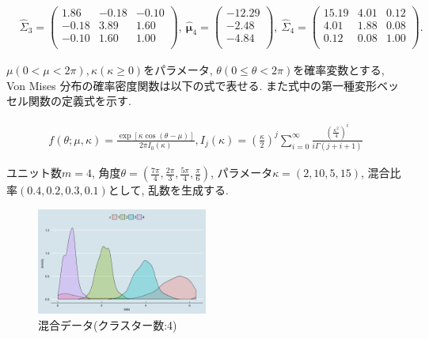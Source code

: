 \documentclass[a4j,12pt]{jarticle}
\begin{document}
\begin{equation}
\begin{split}
&\hat \Sigma_3 = \begin{pmatrix}  1.86  & -0.18 &  -0.10 \\-0.18 & 3.89 & 1.60 \\  -0.10 & 1.60 & 1.00 \\ \end{pmatrix},\ 
\hat{\bm \mu}_4 = \begin{pmatrix} -12.29   \\ -2.48 \\ -4.84 \\ \end{pmatrix},\ 
\hat \Sigma_4 = \begin{pmatrix} 15.19 & 4.01 &  0.12 \\ 4.01 & 1.88 & 0.08 \\ 0.12 & 0.08 &1.00 \\ \end{pmatrix}.
\end{split}
\end{equation}

$\mu(0 < \mu < 2\pi), \kappa(\kappa \geq 0) $をパラメータ, $\theta(0 \leq \theta < 2\pi)$を確率変数とする, Von Mises 分布の確率密度関数は以下の式で表せる. また式中の第一種変形ベッセル関数の定義式を示す.

\begin{eqnarray*}
f(\theta;\mu, \kappa) = \frac{\exp[\kappa \cos(\theta - \mu)]}{2 \pi I_0(\kappa)} , I_j(\kappa) = \left(\frac{\kappa}{2}\right)^j \sum^\infty_{i=0} \frac{\left(\frac{\kappa^2}{4}\right)^i}{i \Gamma(j + i + 1)}
\end{eqnarray*}

ユニット数$m=4$, 角度$\theta = \left( \frac{7\pi}{4}, \frac{2\pi}{3}, \frac{5\pi}{4}, \frac{\pi}{6}\right)$, パラメータ$\kappa= (2,10,5,15)$, 混合比率$(0.4, 0.2, 0.3, 0.1)$として, 乱数を生成する. 

\vspace{-1zh}
\begin{figure}[H]
\begin{center}
\includegraphics[clip,height= 35mm]{data/mix_test_data.png}
\end{center}
\caption{混合データ(クラスター数:4)}

\label{mixdata}
\end{figure}
\end{document}
